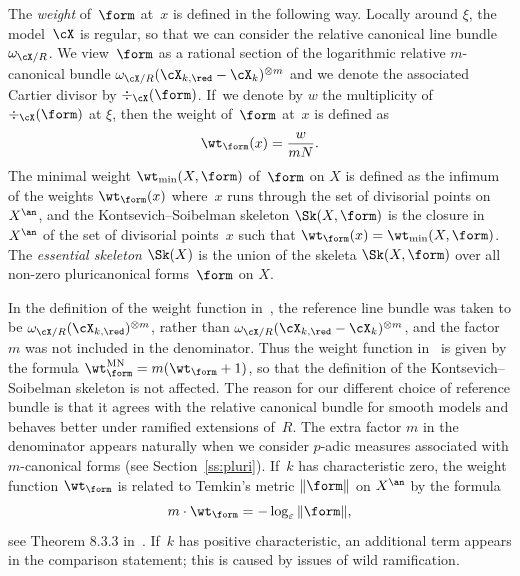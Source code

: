 The {\em weight} of~$\form$ at~$x$ is defined in the following way. Locally around $\xi$, the model~$\cX$ is regular, so that we can consider the relative canonical line bundle $\omega_{\cX/R}$. We view~$\form$ as a rational section of the logarithmic relative $m$-canonical bundle
\hbox{$\omega_{\cX/R}(\cX_{k,\red}-\cX_k)^{\otimes m}$} and we denote the associated Cartier divisor by $\div_{\cX}(\form)$. If~we denote by $w$ the multiplicity of $\div_{\cX}(\form)$ at $\xi$, then the weight of~$\form$ at~$x$ is defined as
\[
\wt_{\form}(x)=\frac{w}{mN}.
\]
The minimal weight $\wt_{\min}(X,\form)$ of~$\form$ on $X$ is defined as
the infimum of the weights $\wt_{\form}(x)$ where~$x$ runs through the set of divisorial points on $X^{\an}$, and the Kontsevich--Soibelman skeleton $\Sk(X,\form)$
is the closure in $X^{\an}$ of the set of divisorial points~$x$ such that $\wt_{\form}(x)=\wt_{\min}(X,\form)$. The {\em essential skeleton} $\Sk(X)$ is the union of the skeleta $\Sk(X,\form)$ over all non-zero
pluricanonical forms~$\form$ on $X$.

\begin{remark}\label{rema:weight}
In the definition of the weight function in~\cite{MuNi}, the reference line bundle was taken to be $\omega_{\cX/R}(\cX_{k,\red})^{\otimes m}$, rather than $\omega_{\cX/R}(\cX_{k,\red}-\cX_k)^{\otimes m}$, and the factor $m$ was not included in the denominator. Thus the weight function in~\cite{MuNi} is given by the formula $\wt^{\mathrm{MN}}_{\form}=m(\wt_{\form}+1)$, so that the definition of the Kontsevich--Soibelman skeleton is not affected. The reason for our different choice of reference bundle is that it agrees with the relative canonical bundle for smooth models and behaves better under ramified extensions of~$R$. The extra factor $m$ in the denominator appears naturally when we consider $p$-adic measures associated with $m$-canonical forms (see Section~\ref{ss:pluri}). If~$k$ has characteristic zero, the weight function $\wt_{\form}$ is related to Temkin's metric $\|\form\|$ on $X^{\an}$ by the formula
\[
m\cdot \wt_{\form}=-\log_{\varepsilon}\|\form\|,
\]
see Theorem 8.3.3 in~\cite{temkin}. If~$k$ has positive characteristic, an additional term appears in the comparison statement; this is caused by issues of wild ramification.
\end{remark}

